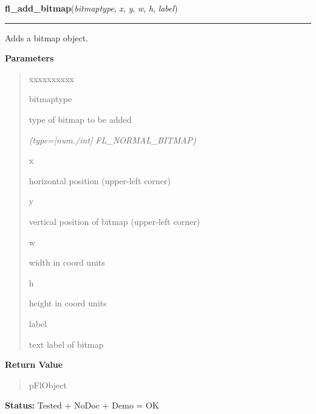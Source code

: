     \label{xformslib:flbitmap:fl_add_bitmap}

    \vspace{0.5ex}

\hspace{.8\funcindent}\begin{boxedminipage}{\funcwidth}

    \raggedright \textbf{fl\_add\_bitmap}(\textit{bitmaptype}, \textit{x}, \textit{y}, \textit{w}, \textit{h}, \textit{label})

    \vspace{-1.5ex}

    \rule{\textwidth}{0.5\fboxrule}
\setlength{\parskip}{2ex}
    Adds a bitmap object.

\setlength{\parskip}{1ex}
      \textbf{Parameters}
      \vspace{-1ex}

      \begin{quote}
        \begin{Ventry}{xxxxxxxxxx}

          \item[bitmaptype]

          type of bitmap to be added

            {\it (type=[num./int] FL\_NORMAL\_BITMAP)}

          \item[x]

          horizontal position (upper-left corner)

          \item[y]

          vertical position of bitmap (upper-left corner)

          \item[w]

          width in coord units

          \item[h]

          height in coord units

          \item[label]

          text label of bitmap

        \end{Ventry}

      \end{quote}

      \textbf{Return Value}
    \vspace{-1ex}

      \begin{quote}
      pFlObject

      \end{quote}

\textbf{Status:} Tested + NoDoc + Demo = OK



    \end{boxedminipage}

